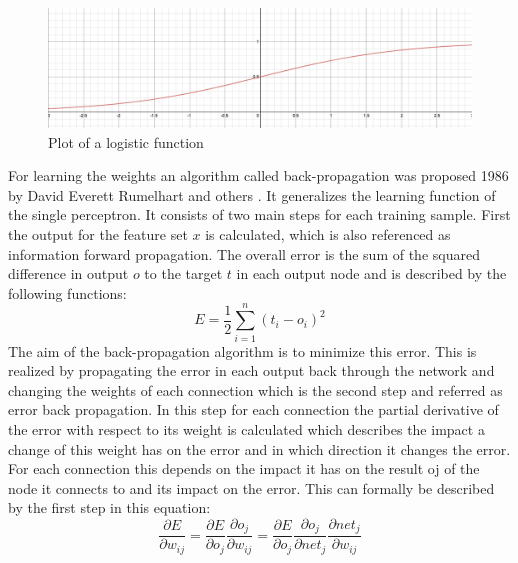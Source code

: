 \begin{figure}[htpb]
  \centering
  \includegraphics[width = \textwidth]{figures/logisticFunc.png}
  \caption{Plot of a logistic function}
  \label{fig:logisFunction}
\end{figure}
For learning the weights an algorithm called back-propagation was proposed 1986 by David Everett Rumelhart and others \cite{rumelhart1988learning}. It generalizes the learning function of the single perceptron. It consists of two main steps for each training sample. First the output for the feature set $x$ is calculated, which is also referenced as information forward propagation. The overall error is the sum of the squared difference in output $o$ to the target $t$ in each output node and is described by the following functions:
\begin{equation}\label{eq:backpErr}
  E = \frac{1}{2} \sum_{i=1}^n (t_i-o_i)^2
\end{equation}
The aim of the back-propagation algorithm is to minimize this error. This is realized by propagating the error in each output back through the network and changing the weights of each connection which is the second step and referred as error back propagation. In this step for each connection the partial derivative of the error with respect to its weight is calculated which describes the impact a change of this weight has on the error and in which direction it changes the error. For each connection this depends on the impact it has on the result oj of the node it connects to and its impact on the error.
\newline
This can formally be described by the first step in this equation:
\begin{equation}\label{eq:backpMainDevi}
  \frac{\partial E}{\partial w_{ij}} =
  \frac{\partial E}{\partial o_j} \frac{\partial o_j}{\partial w_{ij}} = 
  \frac{\partial E}{\partial o_j} \frac{\partial o_j}{\partial net_j} \frac{\partial net_j}{\partial w_{ij}}
\end{equation}

